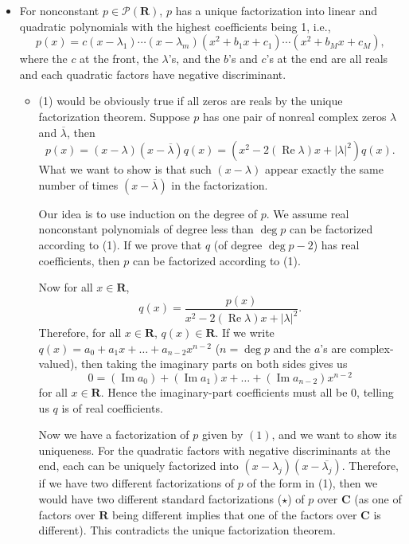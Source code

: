 \documentclass[11pt]{article}
\newcommand{\R}{\mathbf{R}}
\newcommand{\C}{\mathbf{C}}
\renewcommand{\Re}{\operatorname{Re}}
\renewcommand{\Im}{\operatorname{Im}}
\newcommand{\conj}[1]{\overline{#1}}
\newcommand{\abs}[1]{\lvert #1 \rvert}
\begin{document}
\begin{itemize}
    \item For nonconstant $p \in \mathcal{P}(\R)$, $p$ has a unique factorization into linear and quadratic polynomials with the highest coefficients being 1, i.e.,
    \begin{equation}
        p(x)=c(x-\lambda_1)\cdots(x-\lambda_m)(x^2+b_1x+c_1)\cdots(x^2+b_Mx+c_M),
    \end{equation} where the $c$ at the front, the $\lambda$'s, and the $b$'s and $c$'s at the end are all reals and each quadratic factors have negative discriminant.
    \begin{itemize}
        \item (1) would be obviously true if all zeros are reals by the unique factorization theorem. Suppose $p$ has one pair of nonreal complex zeros $\lambda$ and $\conj{\lambda}$, then $$p(x) = (x-\lambda)(x-\conj{\lambda})q(x) = (x^2-2(\Re{\lambda})x+\abs{\lambda}^2)q(x).$$ What we want to show is that such $(x - \lambda)$ appear exactly the same number of times $(x - \conj{\lambda})$ in the factorization.
        
        Our idea is to use induction on the degree of $p$. We assume real nonconstant polynomials of degree less than $\deg p$ can be factorized according to (1). If we prove that $q$ (of degree $\deg p-2$) has real coefficients, then $p$ can be factorized according to (1).
        
        Now for all $x \in \R$, $$q(x) = \frac{p(x)}{x^2-2(\Re{\lambda})x+\abs{\lambda}^2}.$$ Therefore, for all $x \in \R$, $q(x) \in \R$. If we write $q(x) = a_0+a_1x+\dots+a_{n-2}x^{n-2}$ ($n = \deg p$ and the $a$'s are complex-valued), then taking the imaginary parts on both sides gives us $$0 = (\Im a_0)+(\Im a_1)x+\dots+(\Im a_{n-2})x^{n-2}$$ for all $x \in \R$. Hence the imaginary-part coefficients must all be $0$, telling us $q$ is of real coefficients.
        
        Now we have a factorization of $p$ given by $(1)$, and we want to show its uniqueness. For the quadratic factors with negative discriminants at the end, each can be uniquely factorized into $(x-\lambda_j)(x-\conj{\lambda_j})$. Therefore, if we have two different factorizations of $p$ of the form in (1), then we would have two different standard factorizations ($\star$) of $p$ over $\C$ (as one of factors over $\R$ being different implies that one of the factors over $\C$ is different). This contradicts the unique factorization theorem.
    \end{itemize}
\end{itemize}
\end{document}
